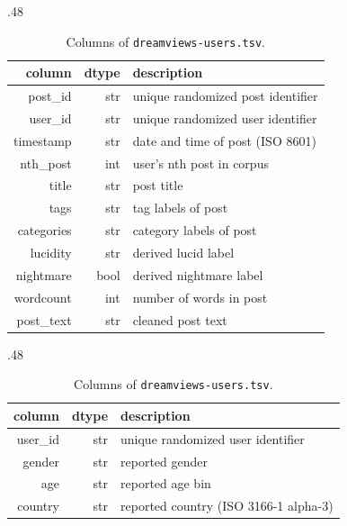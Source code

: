 \documentclass[10pt,a4paper,twocolumn]{article}
\begin{document}
\begin{table}[t]
    \caption{Description of data files.}\label{table:datafiles}
    \begin{subtable}[t]{.48\textwidth}
        \caption{Columns of \texttt{dreamviews-posts.tsv}.}\label{table:datafile-posts}
        \small
        \begin{tabular}{rrl}
            \toprule
            column & dtype & description \\
            \midrule
            post\_id & str & unique randomized post identifier \\
            user\_id & str & unique randomized user identifier \\
            timestamp  & str & date and time of post (ISO 8601) \\
            nth\_post & int & user's nth post in corpus \\
            title & str & post title \\
            tags & str & tag labels of post \\
            categories & str & category labels of post \\
            lucidity & str & derived lucid label \\
            nightmare & bool & derived nightmare label \\
            wordcount & int & number of words in post \\
            post\_text & str & cleaned post text \\
            \bottomrule
        \end{tabular}
    \end{subtable}

    \bigskip
    \begin{subtable}[t]{.48\textwidth}
        \caption{Columns of \texttt{dreamviews-users.tsv}.}\label{table:datafile-users}
        \small
        \begin{tabular}{rrl}
            \toprule
            column & dtype & description \\
            \midrule
            user\_id & str & unique randomized user identifier \\
            gender  & str & reported gender \\
            age     & str & reported age bin \\
            country & str & reported country (ISO 3166-1 alpha-3) \\ %
            \bottomrule
        \end{tabular}
    \end{subtable}
\end{table}
\end{document}
